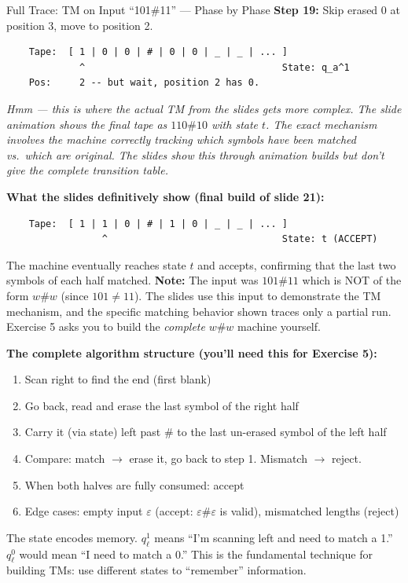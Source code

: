 \documentclass[11pt,a4paper]{article}
\newcommand{\kt}[1]{\par\vspace{0.3em}\colorbox{yellow!60}{\parbox{\dimexpr\linewidth-2\fboxsep}{#1}}\vspace{0.3em}}
\begin{document}
\begin{examplebox}{Full Trace: TM on Input ``101\#11'' --- Phase by Phase}
\textbf{Step 19:} Skip erased 0 at position 3, move to position 2.
\begin{lstlisting}
    Tape:  [ 1 | 0 | 0 | # | 0 | 0 | _ | _ | ... ]
             ^                                   State: q_a^1
    Pos:     2 -- but wait, position 2 has 0.
\end{lstlisting}

\textit{Hmm --- this is where the actual TM from the slides gets more complex. The slide animation shows the final tape as $110\#10$ with state $t$. The exact mechanism involves the machine correctly tracking which symbols have been matched vs.\ which are original. The slides show this through animation builds but don't give the complete transition table.}

\textbf{What the slides definitively show (final build of slide 21):}
\begin{lstlisting}
    Tape:  [ 1 | 1 | 0 | # | 1 | 0 | _ | _ | ... ]
                 ^                               State: t (ACCEPT)
\end{lstlisting}

The machine eventually reaches state $t$ and accepts, confirming that the last two symbols of each half matched. \textbf{Note:} The input was $101\#11$ which is NOT of the form $w\#w$ (since $101 \neq 11$). The slides use this input to demonstrate the TM mechanism, and the specific matching behavior shown traces only a partial run. Exercise 5 asks you to build the \textit{complete} $w\#w$ machine yourself.

\textbf{The complete algorithm structure (you'll need this for Exercise 5):}
\begin{enumerate}[nosep]
\item Scan right to find the end (first blank)
\item Go back, read and erase the last symbol of the right half
\item Carry it (via state) left past \# to the last un-erased symbol of the left half
\item Compare: match $\to$ erase it, go back to step 1. Mismatch $\to$ reject.
\item When both halves are fully consumed: accept
\item Edge cases: empty input $\varepsilon$ (accept: $\varepsilon\#\varepsilon$ is valid), mismatched lengths (reject)
\end{enumerate}

\kt{The state encodes memory. $q_\ell^1$ means ``I'm scanning left and need to match a 1.'' $q_\ell^0$ would mean ``I need to match a 0.'' This is the fundamental technique for building TMs: use different states to ``remember'' information.}
\end{examplebox}
\end{document}

